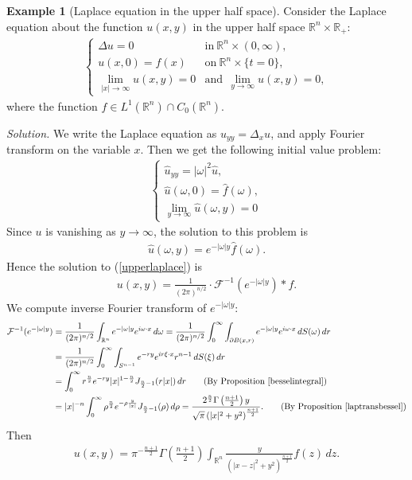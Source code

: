 \documentclass{article}
\numberwithin{equation}{section}
\newcommand{\bbR}{\mathbb{R}}
\renewcommand{\cal}{\mathcal}
\newcommand{\wh}{\widehat}
\theoremstyle{plain}
\theoremstyle{definition}
\newtheorem{example}[theorem]{Example}
\begin{document}
\begin{example}[Laplace equation in the upper half space]
Consider the Laplace equation about the function $u(x,y)$ in the upper half space $\bbR^n\times\bbR_+$:
	\begin{align}
		\begin{cases}
			\Delta u=0 & \mathrm{in}\ \bbR^n\times(0,\infty),\\
			u(x,0)=f(x)& \mathrm{on}\ \bbR^n\times\{t=0\},\\
			\lim_{\vert x\vert\to\infty}u(x,y)=0 &\mathrm{and}\ \ \lim_{ y\to\infty}u(x,y)=0,
		\end{cases}\label{upperlaplace}
	\end{align}
	where the function $f\in L^1(\bbR^n)\cap C_0(\bbR^n)$.
\end{example}
\textit{\hspace{-1.5em}Solution.} We write the Laplace equation as $u_{yy}=\Delta_x u$, and apply Fourier transform on the variable $x$. Then we get the following initial value problem:
\begin{align*}
	\begin{cases}
		\wh{u}_{yy}=\vert\omega\vert^2\wh{u},\\
		\wh{u}(\omega,0)=\wh{f}(\omega),\\
		\lim_{y\to\infty}\wh{u}(\omega,y)=0
	\end{cases}
\end{align*}
Since $u$ is vanishing as $y\to\infty$, the solution to this problem is
\begin{align*}
	\wh{u}(\omega,y)=e^{-\vert\omega\vert y}\wh{f}(\omega).
\end{align*}
Hence the solution to (\ref{upperlaplace}) is \vspace{-0.1cm}
\begin{align*}
	u(x,y)=\frac{1}{(2\pi)^{n/2}}\cdot\cal{F}^{-1}(e^{-\vert\omega\vert y})*f.
\end{align*}
We compute inverse Fourier transform of $e^{-\vert\omega\vert y}$:
\begin{align*}
	\cal{F}^{-1}(e^{-\vert\omega\vert y})&=\frac{1}{(2\pi)^{n/2}}\int_{\bbR^n}e^{-\vert\omega\vert y}e^{i\omega\cdot x}\,d\omega=\frac{1}{(2\pi)^{n/2}}\int_0^\infty\int_{\partial B(x,r)}e^{-\vert\omega\vert y}e^{i\omega\cdot x}\,dS(\omega)\,dr\\
	&=\frac{1}{(2\pi)^{n/2}}\int_0^\infty\int_{S^{n-1}}e^{-ry}e^{ir\xi\cdot x}r^{n-1}\,dS(\xi)\,dr\\
	&=\int_0^\infty r^{\frac{n}{2}}e^{-ry}\vert x\vert^{1-\frac{n}{2}}J_{\frac{n}{2}-1}(r\vert x\vert)\,dr\tag{By Proposition \ref{besselintegral}}\\
	&=\vert x\vert^{-n}\int_0^\infty \rho^{\frac{n}{2}}e^{-\rho\frac{y}{\vert x\vert}}J_{\frac{n}{2}-1}(\rho)\,d\rho=\frac{2^{\frac{n}{2}}\Gamma\left(\frac{n+1}{2}\right)y}{\sqrt{\pi}\left(\vert x\vert^2+y^2\right)^{\frac{n+1}{2}}}.\tag{By Proposition \ref{laptransbessel}}
\end{align*}
Then\vspace{-0.1cm}
\begin{align*}
	u(x,y)=\pi^{-\frac{n+1}{2}}\Gamma\left(\frac{n+1}{2}\right)\int_{\bbR^n} \frac{y}{\left(\vert x-z\vert^2+y^2\right)^{\frac{n+1}{2}}}f(z)\,dz.\tag*{\qed}
\end{align*}
\end{document}
